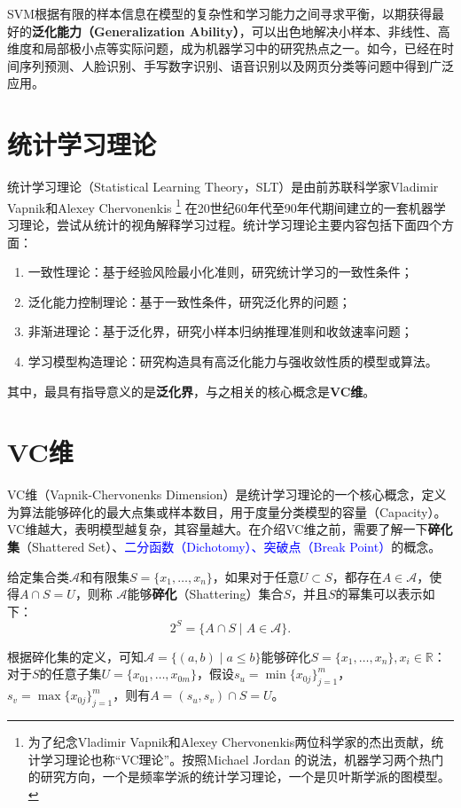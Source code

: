 SVM根据有限的样本信息在模型的复杂性和学习能力之间寻求平衡，以期获得最好的\textbf{泛化能力（Generalization Ability）}，可以出色地解决小样本、非线性、高维度和局部极小点等实际问题，成为机器学习中的研究热点之一。如今，已经在时间序列预测、人脸识别、手写数字识别、语音识别以及网页分类等问题中得到广泛应用。

\section{统计学习理论}
统计学习理论（Statistical Learning Theory，SLT）\cite{vapnik2000nature}是由前苏联科学家Vladimir Vapnik和Alexey Chervonenkis
\footnote{为了纪念Vladimir Vapnik和Alexey Chervonenkis两位科学家的杰出贡献，统计学习理论也称“VC理论”。按照Michael Jordan 的说法，机器学习两个热门的研究方向，一个是频率学派的统计学习理论，一个是贝叶斯学派的图模型。}
在20世纪60年代至90年代期间建立的一套机器学习理论，尝试从统计的视角解释学习过程。统计学习理论主要内容包括下面四个方面：
\begin{enumerate}[（1）]
  \item 一致性理论：基于经验风险最小化准则，研究统计学习的一致性条件；
  \item 泛化能力控制理论：基于一致性条件，研究泛化界的问题；
  \item 非渐进理论：基于泛化界，研究小样本归纳推理准则和收敛速率问题；%
  \item 学习模型构造理论：研究构造具有高泛化能力与强收敛性质的模型或算法。
\end{enumerate}
其中，最具有指导意义的是\textbf{泛化界}，与之相关的核心概念是\textbf{VC维}。

\section{VC维}
VC维（Vapnik-Chervonenks Dimension）是统计学习理论的一个核心概念，定义为算法能够碎化的最大点集或样本数目，用于度量分类模型的容量（Capacity）。VC维越大，表明模型越复杂，其容量越大。在介绍VC维之前，需要了解一下\textbf{碎化集}（Shattered Set）、\textcolor{blue}{二分函数（Dichotomy）、突破点（Break Point）}的概念。

\begin{definition}[碎化集]
给定集合类$\mathcal A$和有限集$S=\{x_1,\ldots, x_n\}$，如果对于任意$U\subset S$，都存在$A\in \mathcal{A}$，使得$A\cap S = U$，则称
$\mathcal A$能够\textbf{碎化}（Shattering）集合$S$，并且$S$的幂集可以表示如下：
\begin{equation}
    2^S = \{A\cap S\mid A\in \mathcal A\}.
\end{equation}
\end{definition}
根据碎化集的定义，可知$\mathcal A=\{(a,b)\mid a\le b\}$能够碎化$S=\{x_1,\ldots, x_n\}, x_i\in \mathbb R$：对于$S$的任意子集$U=\{x_{01},\ldots,x_{0m}\}$，假设$s_u = \min \{x_{0j}\}_{j=1}^m $，$s_v = \max \{x_{0j}\}_{j=1}^m $，则有$A=(s_u,s_v)\cap S = U$。


